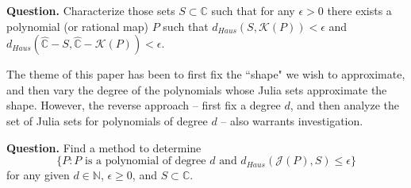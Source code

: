 \documentclass[a4paper,11pt,onecolumn]{amsart}
\theoremstyle{definition}
\begin{document}
 \bigskip
 
 \noindent \textbf{Question.} Characterize those sets $S \subset \mathbb{C}$ such that for any $\epsilon>0$ there exists a polynomial (or rational map) $P$ such that $d_{Haus}(S,\mathcal{K}(P)) < \epsilon$ and $d_{Haus}(\hat{\mathbb{C}} - S,\hat{\mathbb{C}} - \mathcal{K}(P))<\epsilon$.  
\bigskip

The theme of this paper has been to first fix the ``shape" we wish to approximate, and then vary the degree of the polynomials whose Julia sets approximate the shape.  However, the reverse approach  -- first fix a degree $d$, and then analyze the set of Julia sets for polynomials of degree $d$ -- also warrants  investigation.  
 
 \bigskip
 
\noindent \textbf{Question.} Find a method to determine $$\{P: P \textrm{ is a polynomial of degree } d \textrm{ and } d_{Haus}(\mathcal{J}(P), S)  \leq  \epsilon\}$$ for any given $d \in \mathbb{N}$, $ \epsilon \geq 0$, and $S \subset \mathbb{C}$.   

 

 


\nocite{*}
\end{document}

